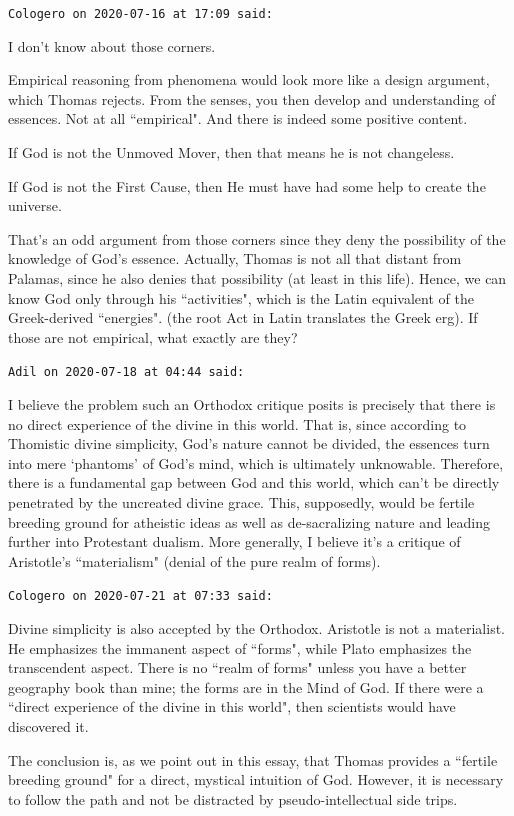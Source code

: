 \begin{footnotesize}
\begin{sffamily}
\hfill

\texttt{Cologero on 2020-07-16 at 17:09 said: }

I don't know about those corners.

Empirical reasoning from phenomena would look more like a design argument, which Thomas rejects. From the senses, you then develop and understanding of essences. Not at all ``empirical". And there is indeed some positive content.

If God is not the Unmoved Mover, then that means he is not changeless.

If God is not the First Cause, then He must have had some help to create the universe.

That's an odd argument from those corners since they deny the possibility of the knowledge of God's essence. Actually, Thomas is not all that distant from Palamas, since he also denies that possibility (at least in this life). Hence, we can know God only through his ``activities", which is the Latin equivalent of the Greek-derived ``energies". (the root Act in Latin translates the Greek erg). If those are not empirical, what exactly are they?


\hfill

\texttt{Adil on 2020-07-18 at 04:44 said: }

I believe the problem such an Orthodox critique posits is precisely that there is no direct experience of the divine in this world. That is, since according to Thomistic divine simplicity, God's nature cannot be divided, the essences turn into mere `phantoms' of God's mind, which is ultimately unknowable. Therefore, there is a fundamental gap between God and this world, which can't be directly penetrated by the uncreated divine grace. This, supposedly, would be fertile breeding ground for atheistic ideas as well as de-sacralizing nature and leading further into Protestant dualism. More generally, I believe it's a critique of Aristotle's ``materialism" (denial of the pure realm of forms).


\hfill

\texttt{Cologero on 2020-07-21 at 07:33 said: }

Divine simplicity is also accepted by the Orthodox. Aristotle is not a materialist. He emphasizes the immanent aspect of ``forms", while Plato emphasizes the transcendent aspect. There is no ``realm of forms" unless you have a better geography book than mine; the forms are in the Mind of God. If there were a ``direct experience of the divine in this world", then scientists would have discovered it.

The conclusion is, as we point out in this essay, that Thomas provides a ``fertile breeding ground" for a direct, mystical intuition of God. However, it is necessary to follow the path and not be distracted by pseudo-intellectual side trips.


\end{sffamily}\end{footnotesize}
